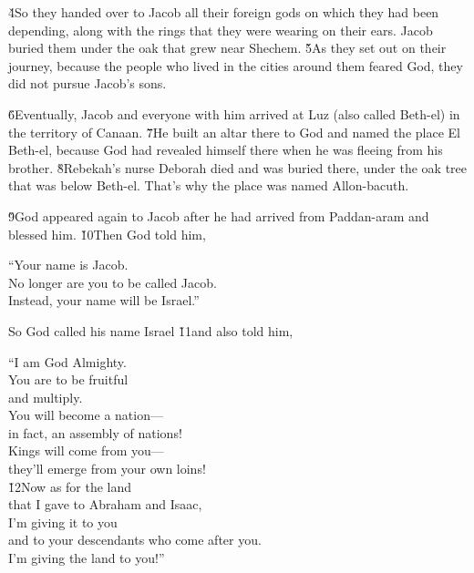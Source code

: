 \v{4}So they handed over to Jacob all their foreign gods on which they had been depending, along with the rings that they were wearing on their ears. Jacob buried them under the oak that grew near Shechem. \v{5}As they set out on their journey, because the people who lived in the cities around them feared God, they did not pursue Jacob's sons.

\v{6}Eventually, Jacob and everyone with him arrived at Luz (also called Beth-el) in the territory of Canaan. \v{7}He built an altar there to God and named the place El Beth-el, because God had revealed himself there when he was fleeing from his brother. \v{8}Rebekah's nurse Deborah died and was buried there, under the oak tree that was below Beth-el. That's why the place was named Allon-bacuth.

\v{9}God appeared again to Jacob after he had arrived from Paddan-aram and blessed him. \v{10}Then God told him,

\begin{poetry}
\poeml ``Your name is Jacob. \\
\poemll    No longer are you to be called Jacob. \\
\poemlll       Instead, your name will be Israel.''
\end{poetry}

So God called his name Israel \v{11}and also told him,

\begin{poetry}
\poeml ``I am God Almighty. \\
\poemll    You are to be fruitful \\
\poemlll       and multiply. \\
\poeml You will become a nation--- \\
\poemll    in fact, an assembly of nations! \\
\poeml Kings will come from you--- \\
\poemll    they'll emerge from your own loins! \\
\poeml \v{12}Now as for the land \\
\poemll    that I gave to Abraham and Isaac, \\
\poeml I'm giving it to you \\
\poemll    and to your descendants who come after you. \\
\poeml I'm giving the land to you!''
\end{poetry}

